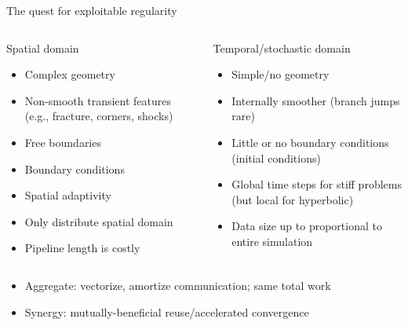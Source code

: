 \documentclass{beamer}
\begin{document}
\begin{frame}{The quest for exploitable regularity}
  \begin{columns}
    \begin{column}{0.5\textwidth}
      \begin{block}{Spatial domain}
        \begin{itemize}
        \item Complex geometry
        \item Non-smooth transient features (e.g., fracture, corners, shocks)
        \item Free boundaries
        \item Boundary conditions
        \item Spatial adaptivity
        \item Only distribute spatial domain
        \item Pipeline length is costly
        \end{itemize} 
      \end{block}
    \end{column}
    \begin{column}{0.5\textwidth}
      \begin{block}{Temporal/stochastic domain}
        \begin{itemize}
        \item Simple/no geometry
        \item Internally smoother (branch jumps rare)
        \item Little or no boundary conditions (initial conditions)
        \item Global time steps for stiff problems (but local for hyperbolic)
        \item Data size up to proportional to entire simulation
        \end{itemize}      
      \end{block}
    \end{column}
  \end{columns}
  \begin{itemize}
  \item<2> \alert{Aggregate:} vectorize, amortize communication; same total work
  \item<2> \alert{Synergy:} mutually-beneficial reuse/accelerated convergence
  \end{itemize}
\end{frame}
\end{document}
